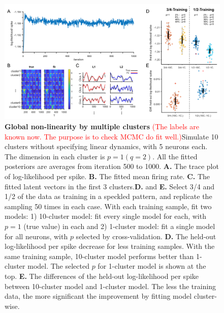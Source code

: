 \documentclass{article}
\begin{document}
	\begin{figure}[h!]
		\centering
		\includegraphics[width=1\textwidth]{figure2.jpg}
		\caption{\textbf{Global non-linearity by multiple clusters} \textcolor{red}{(The labels are known now. The purpose is to check MCMC do fit well.)}Simulate 10 clusters without specifying linear dynamics, with 5 neurons each. The dimension in each cluster is $p=1 (q=2)$. All the fitted posteriors are averages from iteration 500 to 1000. \textbf{A.} The trace plot of log-likelihood per spike. \textbf{B.} The fitted mean firing rate. \textbf{C.} The fitted latent vectors in the first 3 clusters.\textbf{D.} and \textbf{E.} Select 3/4 and 1/2 of the data as training in a speckled pattern, and replicate the sampling 50 times in each case. With each training sample, fit two models: 1) 10-cluster model: fit every single model for each, with $p=1$ (true value) in each and 2) 1-cluster model: fit a single model for all neurons, with $p$ selected by cross-validation. \textbf{D.} The held-out log-likelihood per spike decrease for less training samples. With the same training sample, 10-cluster model performs better than 1-cluster model. The selected $p$ for 1-cluster model is shown at the top. \textbf{E.} The differences of the held-out log-likelihood per spike between 10-cluster model and 1-cluster model. The less the training data, the more significant the improvement by fitting model cluster-wise.}
	\end{figure}
	
\end{document}
